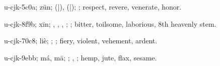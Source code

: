 \begin{multicols}{2}
{\cjkgGlue{}u-cjk-5c0a; zūn; \cjkgGlue{}\cjkgGlue{}(\cjkgGlue{}|\cjkgGlue{}), \cjkgGlue{}\cjkgGlue{}(\cjkgGlue{}|\cjkgGlue{}); \cjkgGlue{}; respect, revere, venerate, honor.

\cjkgGlue{}u-cjk-8f9b; xīn; \cjkgGlue{}\cjkgGlue{}\cjkgGlue{}, \cjkgGlue{}\cjkgGlue{}\cjkgGlue{}, \cjkgGlue{}\cjkgGlue{}\cjkgGlue{}, \cjkgGlue{}; \cjkgGlue{}; bitter, toilsome, laborious, 8th heavenly stem.

\cjkgGlue{}u-cjk-70c8; liè; \cjkgGlue{}\cjkgGlue{}\cjkgGlue{}; \cjkgGlue{}; fiery, violent, vehement, ardent.

\cjkgGlue{}u-cjk-9ebb; má, mā; \cjkgGlue{}; \cjkgGlue{}, \cjkgGlue{}; hemp, jute, flax, sesame.

}
\end{multicols}
